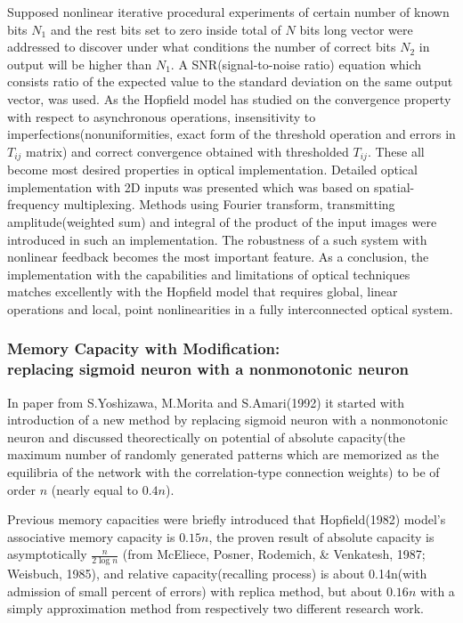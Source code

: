 \documentclass[12pt, a4paper]{article}
\begin{document}
Supposed nonlinear iterative procedural experiments of certain number of known bits $N_1$ and the rest bits set to zero inside total of $N$ bits long vector were addressed to discover under what conditions the number of correct bits $N_2$ in output will be higher than $N_1$. A SNR(signal-to-noise ratio) equation which consists ratio of the expected value to the standard deviation on the same output vector, was used. As the Hopfield model has studied on the convergence property with respect to asynchronous operations, insensitivity to imperfections(nonuniformities, exact form of the threshold operation and errors in $T_{ij}$ matrix) and correct convergence obtained with thresholded $T_{ij}$. These all become most desired properties in optical implementation. Detailed optical implementation with 2D inputs was presented which was based on spatial-frequency multiplexing. Methods using Fourier transform, transmitting amplitude(weighted sum) and integral of the product of the input images were introduced in such an implementation. The robustness of a such system with nonlinear feedback becomes the most important feature.
As a conclusion, the implementation with the capabilities and limitations of optical techniques matches excellently with the Hopfield model that requires global, linear operations and local, point nonlinearities in a fully interconnected optical system.

\subsubsection{Memory Capacity with Modification: \\ replacing sigmoid neuron with a nonmonotonic neuron}
In paper from S.Yoshizawa, M.Morita and S.Amari(1992) \cite{capacity_of_nonmonotonic_model} it started with introduction of a new method by replacing sigmoid neuron with a nonmonotonic neuron and discussed theorectically on potential of absolute capacity(the maximum number of randomly generated patterns which are memorized as the equilibria of the network with the correlation-type connection weights) to be of order $n$ (nearly equal to $0.4n$).

Previous memory capacities were briefly introduced that Hopfield(1982) model's associative memory capacity is $0.15n$, the proven result of absolute capacity is asymptotically $ \frac{n}{2\log{n}} $ (from McEliece, Posner, Rodemich, \& Venkatesh, 1987; Weisbuch, 1985), and relative capacity(recalling process) is about 0.14n(with admission of small percent of errors) with replica method, but about $0.16n$ with a simply approximation method from respectively two different research work.
\end{document}
